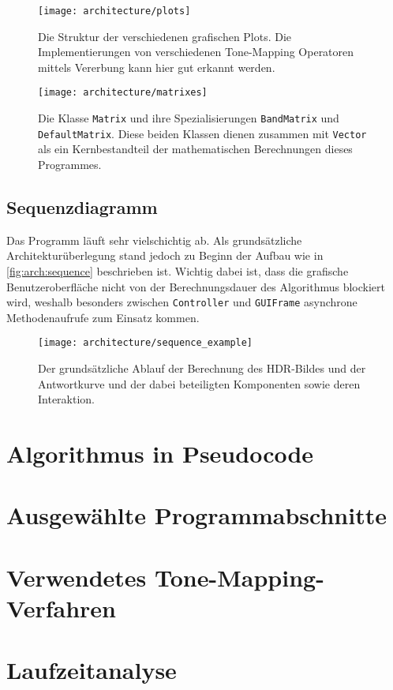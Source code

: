 \begin{figure}[H]
  \begin{center}
    \texttt{[image: architecture/plots]}
    \caption{Die Struktur der verschiedenen grafischen Plots. Die Implementierungen von verschiedenen \gls{Tone-Mapping} Operatoren mittels Vererbung kann hier gut erkannt werden.}
    \label{fig:arch:plots}
  \end{center}
\end{figure}


\begin{figure}[H]
  \begin{center}
    \texttt{[image: architecture/matrixes]}
    \caption{Die Klasse \texttt{Matrix} und ihre Spezialisierungen \texttt{BandMatrix} und \texttt{DefaultMatrix}. Diese beiden Klassen dienen zusammen mit \texttt{Vector} als ein Kernbestandteil der mathematischen Berechnungen dieses Programmes.}
    \label{fig:arch:plots}
  \end{center}
\end{figure}


\subsection{Sequenzdiagramm}
Das Programm läuft sehr vielschichtig ab. Als grundsätzliche Architekturüberlegung stand jedoch zu Beginn der Aufbau wie in \autoref{fig:arch:sequence} beschrieben ist. Wichtig dabei ist, dass die grafische Benutzeroberfläche nicht von der Berechnungsdauer des Algorithmus blockiert wird, weshalb besonders zwischen \texttt{Controller} und \texttt{GUIFrame} asynchrone Methodenaufrufe zum Einsatz kommen.
\begin{figure}[H]
  \begin{center}
    \texttt{[image: architecture/sequence\_example]}
    \caption{Der grundsätzliche Ablauf der Berechnung des HDR-Bildes und der Antwortkurve und der dabei beteiligten Komponenten sowie deren Interaktion. }
    \label{fig:arch:sequence}
  \end{center}
\end{figure}

\section{Algorithmus in Pseudocode}
\label{sec:pseudocode}
\section{Ausgewählte Programmabschnitte}
\label{sec:sample-codes}
\section{Verwendetes \gls{Tone-Mapping}-Verfahren}
\label{sec:tone-mapping}
\section{Laufzeitanalyse}
\label{sec:laufzeit}


